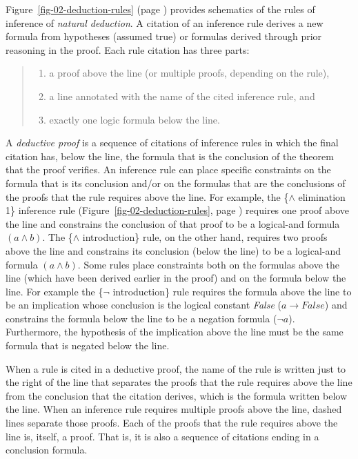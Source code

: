 Figure~\ref{fig-02-deduction-rules} (page \pageref{fig-02-deduction-rules})
provides schematics of the rules of inference of \emph{natural deduction}.
A citation of an inference rule derives a new formula
from hypotheses (assumed true) or formulas derived through prior reasoning in the proof.
Each rule citation
has three parts:
\begin{quote}
\begin{enumerate}
\item a proof above the line (or multiple proofs, depending on the rule),
\item a line annotated with the name of the cited inference rule, and
\item exactly one logic formula below the line.
\end{enumerate}
\end{quote}

\label{def-deductive-proof}
A \emph{deductive proof} is a sequence of citations of inference rules
in which the final citation has, below the line,
the formula that is the conclusion of the theorem that the proof verifies.
An inference rule can place specific constraints on the formula
that is its conclusion and/or on the formulas that are the
conclusions of the proofs that the rule requires above the line.
For example, the \{$\wedge$ elimination 1\} inference rule
(Figure~\ref{fig-02-deduction-rules}, page \pageref{fig-02-deduction-rules})
requires one proof
above the line
and constrains the conclusion of that proof
to be a logical-and formula $(a \wedge b)$.
The \{$\wedge$ introduction\} rule, on the other hand,
requires two proofs above the line and
constrains its conclusion (below the line)
to be a logical-and formula $(a \wedge b)$.
Some rules place constraints both on the formulas
above the line (which have been derived earlier in the proof)
and on the formula
below the line.
For example the \{$\neg$ introduction\} rule requires
the formula above the line to be an implication
whose conclusion is the logical constant \emph{False}
($a \rightarrow False$)
and constrains the formula below the line to be
a negation formula ($\neg a$).
Furthermore, the hypothesis of the implication above the line must be the same
formula that is negated below the line.

When a rule is
cited
in a deductive proof,
the name of the rule is written just to the right of
the line that separates the proofs that the rule requires above the line
from the conclusion that the citation derives,
which is the formula written below the line.
When an inference rule requires multiple proofs above the line,
dashed lines separate those proofs.
Each of the proofs that the rule requires above the line
is, itself, a proof.
That is, it is also a sequence of citations ending in a conclusion formula.

